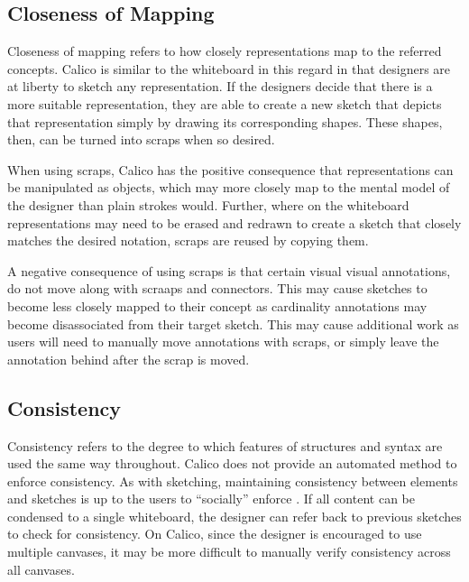 \documentclass[12pt,fleqn]{ucithesis}
\begin{document}
\subsection{Closeness of Mapping}


Closeness of mapping refers to how closely representations map to the referred concepts. Calico is similar to the whiteboard in this regard in that designers are at liberty to sketch any representation. If the designers decide that there is a more suitable representation, they are able to create a new sketch that depicts that representation simply by drawing its corresponding shapes. These shapes, then, can be turned into scraps when so desired. 

When using scraps, Calico has the positive consequence that representations can be manipulated as objects, which may more closely map to the mental model of the designer than plain strokes would. Further, where on the whiteboard representations may need to be erased and redrawn to create a sketch that closely matches the desired notation, scraps are reused by copying them. 

A negative consequence of using scraps is that certain visual visual annotations, do not move along with scraaps and connectors. This may cause sketches to become less closely mapped to their concept as cardinality annotations may become disassociated from their target sketch. This may cause additional work as users will need to manually move annotations with scraps, or simply leave the annotation behind after the scrap is moved. 

%

\subsection{Consistency}
Consistency refers to the degree to which features of structures and syntax are used the same way throughout. Calico does not provide an automated method to enforce consistency. As with sketching, maintaining consistency between elements and sketches is up to the users to ``socially'' enforce \cite{Petre2013BookChapter}. If all content can be condensed to a single whiteboard, the designer can refer back to previous sketches to check for consistency. On Calico, since the designer is encouraged to use multiple canvases, it may be more difficult to manually verify consistency across all canvases.
\end{document}
